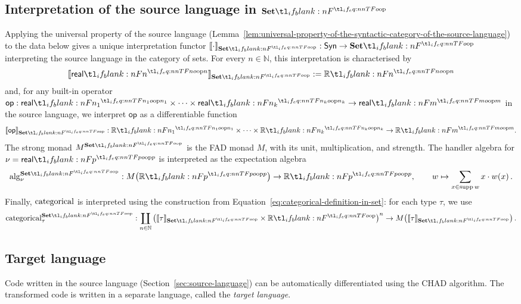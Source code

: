 \documentclass[11pt,a4paper]{article}
\theoremstyle{definition}
\theoremstyle{remark}
\providecommand{\N}{\mathbb{N}}
\providecommand{\Syn}{\mathsf{Syn}}
\providecommand{\srcop}{\mathsf{op}}
\providecommand{\supp}{\operatorname{supp}}
\providecommand{\setint}[1]{\llbracket #1\rrbracket_{\Set}}
\providecommand{\categ}{\operatorname{categorical}}
\begin{document}
\subsection{Interpretation of the source language in \texorpdfstring{\( \Set \)}{Set}}
\label{sec:interpretation-of-source-language-in-set}

Applying the universal property of the source language (Lemma~\ref{lem:universal-property-of-the-syntactic-category-of-the-source-language}) to the data below gives a unique interpretation functor \( \setint{\cdot}: \Syn \to \Set \) interpreting the source language in the category of sets. For every \( n \in \N \), this interpretation is characterised by
\begin{equation}
  \label{eq:interpretation-reals-in-set}
  \setint{\srcreal[n]} := \R[n]
\end{equation}
and, for any built-in operator \( \srcop: \srcreal[n_{1}] \times \cdots \times \srcreal[n_{k}] \to \srcreal[m] \) in the source language, we interpret \( \srcop \) as a differentiable function
\begin{equation}
  \label{eq:interpretation-operations-in-set}
  \setint{\srcop} : \R[n_{1}] \times \cdots \times \R[n_{k}] \to \R[m].
\end{equation}
The strong monad \( M^{\Set} \) is the FAD monad \( M \), with its unit, multiplication, and strength. The handler algebra for \( \nu = \srcreal[p] \) is interpreted as the expectation algebra
\begin{equation*}
  \opn{alg}^{\Set}_{\nu}: \Fun[nn]{ M }{ \R[p] } \to \R[p],
  \qquad
  w \mapsto \sum_{x \in \supp w} x \cdot \fn[n]{ w }{ x }.
\end{equation*}
Finally, \( \opn[b]{categorical} \) is interpreted using the construction from Equation~\eqref{eq:categorical-definition-in-set}: for each type \( \tau \), we use
\begin{equation*}
  \categ^{\Set}_{\tau}:\coprod_{n \in \N} \left( \setint{\tau} \times \R \right)^{n} \to \Fun[nn]{ M }{ \setint{\tau} }.\end{equation*}

\subsection{Target language}
\label{sec:target-language}

Code written in the source language (Section~\ref{sec:source-language}) can be automatically differentiated using the CHAD algorithm. The transformed code is written in a separate language, called the \emph{target language}.
\end{document}
